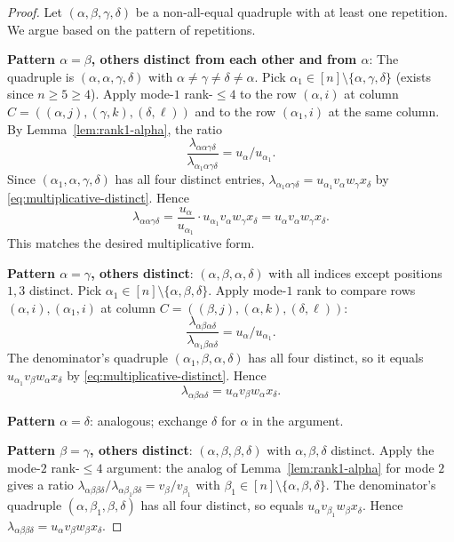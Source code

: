 \documentclass[12pt]{article}
\theoremstyle{definition}
\begin{document}
\begin{proof}
Let $(\alpha,\beta,\gamma,\delta)$ be a non-all-equal quadruple with at least one repetition.
We argue based on the pattern of repetitions.

\textbf{Pattern $\alpha=\beta$, others distinct from each other and from $\alpha$}: The
quadruple is $(\alpha,\alpha,\gamma,\delta)$ with $\alpha\neq\gamma\neq\delta\neq\alpha$.
Pick $\alpha_1\in[n]\setminus\{\alpha,\gamma,\delta\}$ (exists since $n\geq 5\geq 4$).
Apply mode-$1$ rank-$\leq 4$ to the row $(\alpha,i)$ at column
$C=((\alpha,j),(\gamma,k),(\delta,\ell))$ and to the row $(\alpha_1,i)$ at the same column.
By Lemma~\ref{lem:rank1-alpha}, the ratio
\[
\frac{\lambda_{\alpha\alpha\gamma\delta}}{\lambda_{\alpha_1\alpha\gamma\delta}}=u_\alpha/u_{\alpha_1}.
\]
Since $(\alpha_1,\alpha,\gamma,\delta)$ has all four distinct entries,
$\lambda_{\alpha_1\alpha\gamma\delta}=u_{\alpha_1}v_\alpha w_\gamma x_\delta$ by
\eqref{eq:multiplicative-distinct}. Hence
\[
\lambda_{\alpha\alpha\gamma\delta}=\frac{u_\alpha}{u_{\alpha_1}}\cdot u_{\alpha_1}v_\alpha w_\gamma x_\delta
=u_\alpha v_\alpha w_\gamma x_\delta.
\]
This matches the desired multiplicative form.

\textbf{Pattern $\alpha=\gamma$, others distinct}: $(\alpha,\beta,\alpha,\delta)$ with all
indices except positions $1,3$ distinct. Pick $\alpha_1\in[n]\setminus\{\alpha,\beta,\delta\}$.
Apply mode-$1$ rank to compare rows $(\alpha,i),(\alpha_1,i)$ at column
$C=((\beta,j),(\alpha,k),(\delta,\ell))$:
\[
\frac{\lambda_{\alpha\beta\alpha\delta}}{\lambda_{\alpha_1\beta\alpha\delta}}=u_\alpha/u_{\alpha_1}.
\]
The denominator's quadruple $(\alpha_1,\beta,\alpha,\delta)$ has all four distinct, so it
equals $u_{\alpha_1}v_\beta w_\alpha x_\delta$ by \eqref{eq:multiplicative-distinct}. Hence
\[
\lambda_{\alpha\beta\alpha\delta}=u_\alpha v_\beta w_\alpha x_\delta.
\]

\textbf{Pattern $\alpha=\delta$}: analogous; exchange $\delta$ for $\alpha$ in the argument.

\textbf{Pattern $\beta=\gamma$, others distinct}: $(\alpha,\beta,\beta,\delta)$ with $\alpha,\beta,\delta$
distinct. Apply the mode-$2$ rank-$\leq 4$ argument: the analog of
Lemma~\ref{lem:rank1-alpha} for mode $2$ gives a ratio
$\lambda_{\alpha\beta\beta\delta}/\lambda_{\alpha\beta_1\beta\delta}=v_\beta/v_{\beta_1}$
with $\beta_1\in[n]\setminus\{\alpha,\beta,\delta\}$. The denominator's quadruple
$(\alpha,\beta_1,\beta,\delta)$ has all four distinct, so equals
$u_\alpha v_{\beta_1}w_\beta x_\delta$. Hence
$\lambda_{\alpha\beta\beta\delta}=u_\alpha v_\beta w_\beta x_\delta$.


\end{proof}
\end{document}
